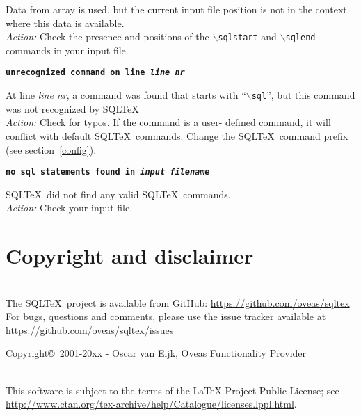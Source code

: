 \documentclass{article}
\newcommand{\bs}{\ensuremath{\backslash}}
\newcommand{\vs}{\vspace{3mm}}
\begin{document}
\vspace{1mm}

\noindent Data from array is used, but the current input file position is not in the context where this data is available.\\
\textit{Action:} Check the presence and positions of the \texttt{\bs sqlstart} and \texttt{\bs sqlend} commands in your input file.

\vs

\noindent\textbf{\texttt{unrecognized command on line \textit{line nr}}}

\vspace{1mm}

\noindent At line \textit{line nr}, a command was found that starts with ``\texttt{\bs sql}'',
but this command was not recognized by SQL\TeX\. \\
\textit{Action:} Check for typos. If the command is a user- defined command, it will
conflict with default SQL\TeX\ commands. Change the SQL\TeX\ command prefix (see section~\ref{config}).

\vs

\noindent\textbf{\texttt{no sql statements found in \textit{input filename}}}

\vspace{1mm}

\noindent SQL\TeX\ did not find any valid SQL\TeX\ commands. \\
\textit{Action:} Check your input file.


\section{Copyright and disclaimer}

\noindent\hrulefill \\
The SQL\TeX\ project is available from GitHub: \url{https://github.com/oveas/sqltex}\\
For bugs, questions and comments, please use the issue tracker available at \url{https://github.com/oveas/sqltex/issues}

\vspace{3mm}

\noindent Copyright\copyright\ 2001-20xx - Oscar van Eijk, Oveas Functionality Provider

\noindent\hrulefill \\

\noindent This software is subject to the terms of the LaTeX Project Public License; 
see \url{http://www.ctan.org/tex-archive/help/Catalogue/licenses.lppl.html}.
\end{document}
